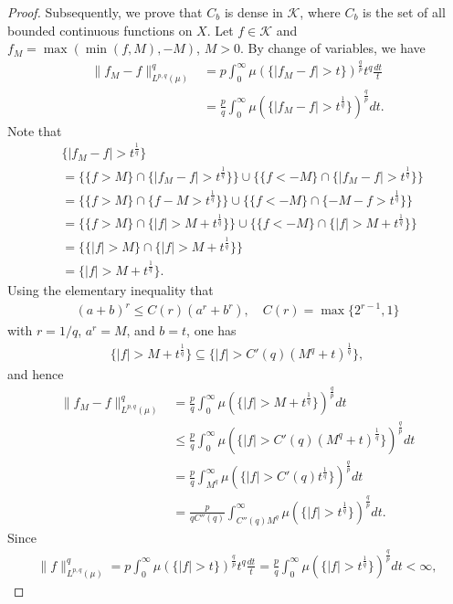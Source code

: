 \documentclass[10pt,a4paper]{amsart}
\begin{document}
\begin{proof}
Subsequently, we prove that $C_{b}$ is dense in $\mathcal{K}$, where $C_{b}$ is the set of all bounded continuous functions on $X$. Let $f\in\mathcal{K}$ and $f_{M}=\max(\min(f,M),-M)$, $M>0$. By change of variables, we have
\begin{align*}
\|f_{M}-f\|_{L^{p,q}(\mu)}^{q}&=p\int_{0}^{\infty}\mu(\{|f_{M}-f|>t\})^{\frac{q}{p}}t^{q}\frac{dt}{t}\\
&=\frac{p}{q}\int_{0}^{\infty}\mu(\{|f_{M}-f|>t^{\frac{1}{q}}\})^{\frac{q}{p}}dt.
\end{align*}
Note that 
\begin{align*}
&\{|f_{M}-f|>t^{\frac{1}{q}}\}\\
&=\{\{f>M\}\cap\{|f_{M}-f|>t^{\frac{1}{q}}\}\}\cup\{\{f<-M\}\cap\{|f_{M}-f|>t^{\frac{1}{q}}\}\}\\
&=\{\{f>M\}\cap\{f-M>t^{\frac{1}{q}}\}\}\cup\{\{f<-M\}\cap\{-M-f>t^{\frac{1}{q}}\}\}\\
&=\{\{f>M\}\cap\{|f|>M+t^{\frac{1}{q}}\}\}\cup\{\{f<-M\}\cap\{|f|>M+t^{\frac{1}{q}}\}\}\\
&=\{\{|f|>M\}\cap\{|f|>M+t^{\frac{1}{q}}\}\}\\
&=\{|f|>M+t^{\frac{1}{q}}\}.
\end{align*}
Using the elementary inequality that
\begin{align*}
(a+b)^{r}\leq C(r)(a^{r}+b^{r}),\quad C(r)=\max\{2^{r-1},1\}
\end{align*}
with $r=1/q$, $a^{r}=M$, and $b=t$, one has 
\begin{align*}
\{|f|>M+t^{\frac{1}{q}}\}\subseteq\{|f|>C'(q)(M^{q}+t)^{\frac{1}{q}}\},
\end{align*}
and hence
\begin{align*}
\|f_{M}-f\|_{L^{p,q}(\mu)}^{q}&=\frac{p}{q}\int_{0}^{\infty}\mu(\{|f|>M+t^{\frac{1}{q}}\})^{\frac{q}{p}}dt\\
&\leq\frac{p}{q}\int_{0}^{\infty}\mu(\{|f|>C'(q)(M^{q}+t)^{\frac{1}{q}}\})^{\frac{q}{p}}dt\\
&=\frac{p}{q}\int_{M^{q}}^{\infty}\mu(\{|f|>C'(q)t^{\frac{1}{q}}\})^{\frac{q}{p}}dt\\
&=\frac{p}{qC''(q)}\int_{C''(q)M^{q}}^{\infty}\mu(\{|f|>t^{\frac{1}{q}}\})^{\frac{q}{p}}dt.
\end{align*}
Since
\begin{align*}
\|f\|_{L^{p,q}(\mu)}^{q}=p\int_{0}^{\infty}\mu(\{|f|>t\})^{\frac{q}{p}}t^{q}\frac{dt}{t}=\frac{p}{q}\int_{0}^{\infty}\mu(\{|f|>t^{\frac{1}{q}}\})^{\frac{q}{p}}dt<\infty,
\end{align*}

\end{proof}
\end{document}
